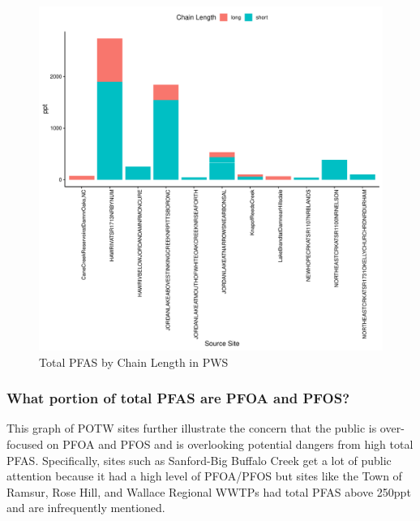 \documentclass[
  12pt,
]{article}
\begin{document}
\begin{figure}

\includegraphics{PFAS_FinalProject_files/figure-latex/unnamed-chunk-21-1} \hfill{}

\caption{Total PFAS by Chain Length in PWS}\label{fig:unnamed-chunk-21}
\end{figure}

\hypertarget{what-portion-of-total-pfas-are-pfoa-and-pfos}{%
\subsubsection{What portion of total PFAS are PFOA and
PFOS?}\label{what-portion-of-total-pfas-are-pfoa-and-pfos}}

This graph of POTW sites further illustrate the concern that the public
is over-focused on PFOA and PFOS and is overlooking potential dangers
from high total PFAS. Specifically, sites such as Sanford-Big Buffalo
Creek get a lot of public attention because it had a high level of
PFOA/PFOS but sites like the Town of Ramsur, Rose Hill, and Wallace
Regional WWTPs had total PFAS above 250ppt and are infrequently
mentioned.
\end{document}

